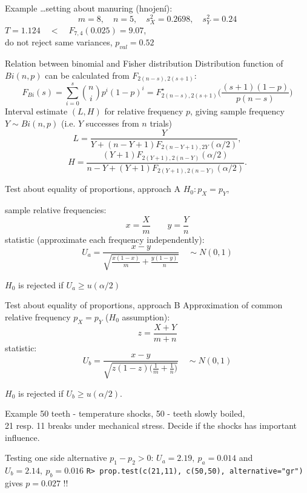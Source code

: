 \documentclass[smaller]{beamer}
\def\xskip{{\vspace{2ex}}}
\def\cz#1{{\small (#1)}}
\begin{document}
\begin{frame}{Example}
\dots setting about manuring \cz{hnojení}: 
\[
 m=8,\quad n=5,\quad s_X^2=0.2698,\quad s_Y^2=0.24
\]
$T = 1.124\quad <\quad F_{7,4}(0.025) = 9.07$,\\
do not reject same variances, $p_{val}=0.52$
 
\end{frame}


\begin{frame}{Relation between binomial and Fisher distribution}
Distribution function of $Bi(n,p)$ can be calculated from $F_{2(n-s),2(s+1)}$:
\[
 F_{Bi}(s) = \sum_{i=0}^s \binom{n}{i} p^i (1-p)^i = F^\star_{2(n-s),2(s+1)}\Big(\frac{(s+1)(1-p)}{p(n-s)}\Big) 
\]
Interval estimate $(L,H)$ for relative frequency $p$, giving sample frequency $Y\sim Bi(n,p)$ (i.e. $Y$ successes from $n$ trials)
\[
 L = \frac{Y}{Y +(n-Y+1)F_{2(n-Y+1),2Y}(\alpha / 2)},
\]
\[
 H = \frac{(Y+1)F_{2(Y+1),2(n-Y)}(\alpha / 2)}{n-Y +(Y+1)F_{2(Y+1),2(n-Y)}(\alpha / 2)}.
\]
\end{frame}


\begin{frame}{Test about equality of proportions, approach A}
$H_0: p_X = p_Y$, 

sample relative frequencies:
\[
 x=\frac{X}{m}\qquad y=\frac{Y}{n}
\]
statistic (approximate each frequency independently):
\[
 U_a = \frac{x-y}{\sqrt{\frac{x(1-x)}{m} + \frac{y(1-y)}{n}}} \quad \sim N(0,1)
\]

$H_0$ is rejected if $U_a \ge u(\alpha / 2)$ 
\end{frame}

\begin{frame}{Test about equality of proportions, approach B}
Approximation of common relative frequency $p_X = p_Y$ ($H_0$ assumption):
\[
 z = \frac{X + Y}{m+n}
\]
statistic:
\[
 U_b = \frac{x-y}{\sqrt{z(1-z)\big(\frac{1}{m} + \frac{1}{n}\big)}} \quad \sim N(0,1)
\]

$H_0$ is rejected if $U_b \ge u(\alpha / 2)$. 
\end{frame}

\begin{frame}[fragile]{Example}
 50 teeth - temperature shocks, 50 - teeth slowly boiled,\\
 21 resp. 11 breaks under mechanical stress. Decide if the 
 shocks has important influence.
 
 \xskip
 Testing one side alternative $p_1 - p_2 >0$:
 $U_a = 2.19,\ p_a=0.014$ and $U_b=2.14,\ p_b=0.016$ 
 \verb'R> prop.test(c(21,11), c(50,50), alternative="gr")'\\
 gives $p=0.027$ !!
\end{frame}
\end{document}
